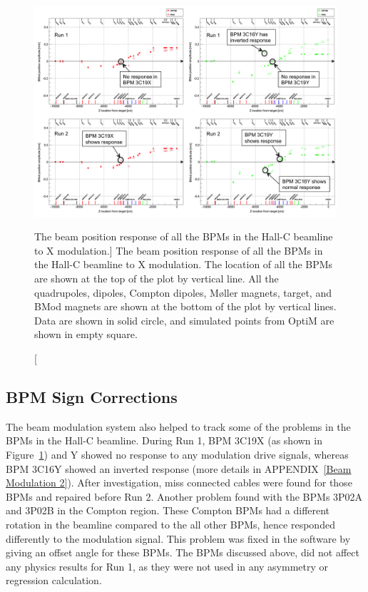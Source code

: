 \begin{singlespace}
\begin{figure}[!h]
	\begin{center}
	\includegraphics[width=15.0cm]{figures/BModBPMSignCorrection}
	\end{center}
	\caption
	[The beam position response of all the BPMs in the Hall-C beamline to X modulation.]
	{The beam position response of all the BPMs in the Hall-C beamline to X modulation. The location of all the BPMs are shown at the top of the plot by vertical line. All the quadrupoles, dipoles, Compton dipoles, M{\o}ller magnets, target, and BMod magnets are shown at the bottom of the plot by vertical lines. Data are shown in solid circle, and simulated points from OptiM are shown in empty square.}
	\label{fig:BModBPMSignCorrection}
\end{figure}
\end{singlespace}


\subsection{BPM Sign Corrections}
\label{BPM Sign Corrections}

The beam modulation system also helped to track some of the problems in the BPMs in the Hall-C beamline. During Run 1, BPM 3C19X (as shown in Figure~\ref{fig:BModBPMSignCorrection}) and Y showed no response to any modulation drive signals, whereas BPM 3C16Y showed an inverted response (more details in APPENDIX~\ref{Beam Modulation 2}). After investigation, miss connected cables were found for those BPMs and repaired before Run 2. 
Another problem found with the BPMs 3P02A and 3P02B in the Compton region. These Compton BPMs had a different rotation in the beamline compared to the all other BPMs, hence responded differently to the modulation signal. This problem was fixed in the software by giving an offset angle for these BPMs.
The BPMs discussed above, did not affect any physics results for Run 1, as they were not used in any asymmetry or regression calculation. 

